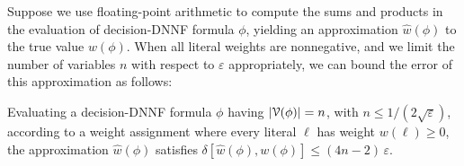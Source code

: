\documentclass[letterpaper,USenglish,cleveref, autoref, thm-restate]{lipics-v2021}
\newcommand{\lit}{\ell}
\newcommand{\approximate}[1]{\hat{#1}}
\newcommand{\approxw}{\approximate{w}}
\newcommand{\aerror}{\delta}
\newcommand{\roundepsilon}{\varepsilon}
\newcommand{\dependencyset}{{\cal V}}
\begin{document}
Suppose we use floating-point arithmetic to compute the sums and products in the evaluation of decision-DNNF formula $\phi$, yielding
an approximation $\approxw(\phi)$ to the true value $w(\phi)$.  When all literal weights are nonnegative, and we limit the number of variables $n$ with respect to $\roundepsilon$ appropriately,
we can bound the error of this approximation as follows:
\begin{lemma}
  Evaluating a decision-DNNF formula $\phi$ having $|\dependencyset(\phi)| = n$, with $n \leq 1/(2\sqrt{\roundepsilon})$, according to a weight assignment where every literal $\lit$ has weight $w(\lit) \geq 0$,
the approximation $\approxw(\phi)$ satisfies
  $\aerror[\approxw(\phi), w(\phi)] \leq (4n-2)\,\roundepsilon$.
  \label{lemma:approx:pos}
\end{lemma}
\end{document}
